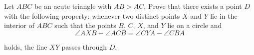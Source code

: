 Let $ABC$ be an acute triangle with $AB>AC$. Prove that there exists a point $D$ with the following property: whenever two distinct points $X$ and $Y$ lie in the interior of $ABC$ such that the points $B$,  $C$,  $X$,  and $Y$ lie on a circle and$$\angle AXB-\angle ACB=\angle CYA-\angle CBA$$

holds, the line $XY$ passes through $D$.